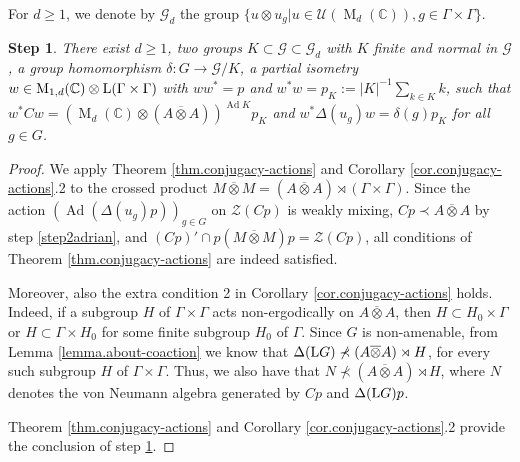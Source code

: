 \documentclass[a4paper,11pt]{amsart}
\numberwithin{equation}{section}
\newtheorem{step}{Step}[section]
\begin{document}
For $d{\geqslant} 1$, we denote by ${\mathcal{G}}_d$ the group $\{u\otimes u_g|u\in{\mathcal{U}}({\operatorname{M}}_d({\mathbb{C}})), g\in\Gamma\times\Gamma\}$.

\begin{step}\label{step3adrian}
There exist $d{\geqslant} 1$, two groups $K\subset{\mathcal{G}}\subset{\mathcal{G}}_d$ with $K$ finite and normal in ${\mathcal{G}}$, a group homomorphism $\delta:G\rightarrow{\mathcal{G}}/K$, a partial isometry $w\in {\operatorname{M}}_{1,d}({\mathbb{C}})\otimes {\mathord{\text{\rm L}}}(\Gamma\times\Gamma)$ with $ww^*=p$ and $w^*w=p_K:=|K|^{-1}\sum_{k\in K} k$,  such that
$w^*Cw=({\operatorname{M}}_d({\mathbb{C}})\otimes (A\overline{\otimes}A))^{{\operatorname{Ad}} K} p_K$ and $w^*\Delta(u_g)w=\delta(g)p_K$ for all $g\in G$.
\end{step}
\begin{proof}
We apply Theorem \ref{thm.conjugacy-actions} and Corollary \ref{cor.conjugacy-actions}.2 to the crossed product $M\overline{\otimes}M=(A\overline{\otimes}A)\rtimes (\Gamma\times\Gamma)$. Since the action $({\operatorname{Ad}}(\Delta(u_g)p))_{g\in G}$ on ${\mathcal{Z}}(Cp)$ is weakly mixing, $Cp\prec A\overline{\otimes}A$ by step \ref{step2adrian}, and $(Cp)'\cap p(M\overline{\otimes}M)p={\mathcal{Z}}(Cp)$, all conditions of Theorem \ref{thm.conjugacy-actions} are indeed satisfied.

Moreover, also the extra condition 2 in Corollary \ref{cor.conjugacy-actions} holds. Indeed, if a subgroup $H$ of $\Gamma\times\Gamma$ acts non-ergodically on $A\overline{\otimes}A$, then $H\subset H_0\times\Gamma$ or $H\subset \Gamma\times H_0$ for some finite subgroup $H_0$ of $\Gamma$.
Since $G$ is non-amenable, from Lemma \ref{lemma.about-coaction} we know that $\Delta({\mathord{\text{\rm L}}} G)\nprec (A\overline{\otimes}A)\rtimes H$, for every such subgroup $H$ of $\Gamma \times \Gamma$. Thus, we also have that $N\nprec (A\overline{\otimes}A)\rtimes H$, where $N$ denotes the von Neumann algebra generated by $Cp$ and $\Delta({\mathord{\text{\rm L}}} G)p$.

Theorem \ref{thm.conjugacy-actions} and Corollary \ref{cor.conjugacy-actions}.2 provide the conclusion of step \ref{step3adrian}.
\end{proof}
\end{document}
